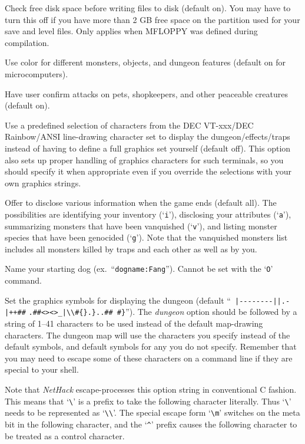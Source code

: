 \item[\ib{checkspace}]
Check free disk space before writing files to disk (default on).
You may have to turn this off if you have more than 2 GB free space
on the partition used for your save and level files.
Only applies when MFLOPPY was defined during compilation.
\item[\ib{color}]
Use color for different monsters, objects, and dungeon features
(default on for microcomputers).
\item[\ib{confirm}]
Have user confirm attacks on pets, shopkeepers, and other
peaceable creatures (default on).
\item[\ib{DECgraphics}]
Use a predefined selection of characters from the DEC VT-xxx/DEC
Rainbow/ANSI line-drawing character set to display the dungeon/effects/traps
instead of having to define a full graphics set yourself (default off).
This option also sets up proper handling of graphics
characters for such terminals, so you should specify it when appropriate
even if you override the selections with your own graphics strings.
\item[\ib{disclose}]
Offer to disclose various information when the game ends (default all).
The possibilities are identifying your inventory (`{\tt i}'),
disclosing your attributes (`{\tt a}'), summarizing monsters that have been
vanquished (`{\tt v}'), and listing monster species that have been
genocided (`{\tt g}').
Note that the vanquished monsters list includes all monsters killed by
traps and each other as well as by you.
\item[\ib{dogname}]
Name your starting dog (ex.\ ``{\tt dogname:Fang}'').
Cannot be set with the `{\tt O}' command.
\item[\ib{dungeon}]
Set the graphics symbols for displaying the dungeon (default
``\verb& |--------||.-|++##& \verb&.##<><>_|\\#{}.}..## #}&'').
The {\it dungeon\/} option should be
followed by a string of 1--41
characters to be used instead of the default map-drawing characters.
The dungeon map will use the characters you specify instead of the
default symbols, and default symbols for any you do not specify.
Remember that you may need to escape some of these characters
on a command line if they are special to your shell.

Note that {\it NetHack\/} escape-processes this option string in conventional C
fashion.  This means that `\verb+\+' is a prefix to take the following
character literally.  Thus `\verb+\+' needs to be represented as `\verb+\\+'.
The special escape form
`\verb+\m+' switches on the meta bit in the following character, and the
`{\tt \^{}}' prefix causes the following character to be treated as a control
character.

